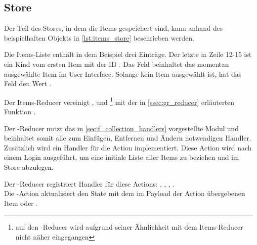 \subsection{Store}
\label{ssec:fi_store}

Der Teil des Stores, in dem die Items gespeichert sind, kann anhand des
beispielhaften Objekts in \cref{lst:items_store} beschrieben werden.



Die Items-Liste enthält in dem Beispiel drei Einträge.  Der letzte in Zeile
12-15 ist ein Kind vom ersten Item mit der ID .  Das Feld
 beinhaltet das momentan ausgewählte Item im User-Interface.
Solange kein Item ausgewählt ist, hat das Feld den Wert .

Der Items-Reducer vereinigt ,  und
\footnote{auf den -Reducer wird aufgrund
seiner Ähnlichkeit mit dem Items-Reducer nicht näher eingegangen} mit der in
\cref{ssec:gr_reducer} erläuterten Funktion .

Der -Reducer nutzt das in \cref{sec:f_collection_handlers}
vorgestellte \-Modul und beinhaltet somit alle zum
Einfügen, Entfernen und Ändern notwendigen Handler.  Zusätzlich wird ein
Handler für die Action  implementiert.  Diese
Action wird nach einem Login ausgeführt, um eine initiale Liste aller Items
zu beziehen und im Store abzulegen.

Der -Reducer registriert Handler für diese Actions:
, ,
, .\\
Die -Action aktualisiert den State mit dem im
Payload der Action übergebenen Item oder .
